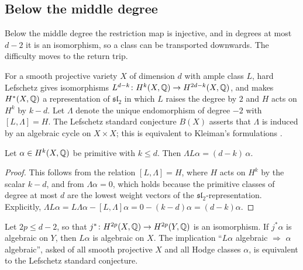 \subsection{Below the middle degree}

Below the middle degree the restriction map is injective, and in degrees at
most $d-2$ it is an isomorphism, so a class can be transported downwards. The
difficulty moves to the return trip.

\begin{definition}\label{def:Bconj}
For a smooth projective variety $X$ of dimension $d$ with ample class $L$,
hard Lefschetz gives isomorphisms
$L^{d-k}\colon H^{k}(X,\mathbb{Q})\to H^{2d-k}(X,\mathbb{Q})$, and makes $H^{*}(X,\mathbb{Q})$
a representation of $\mathfrak{sl}_{2}$ in which $L$ raises the degree by
$2$ and $H$ acts on $H^{k}$ by $k-d$. Let $\Lambda$ denote the unique
endomorphism of degree $-2$ with $[L,\Lambda]=H$. The Lefschetz standard
conjecture $B(X)$ asserts that $\Lambda$ is induced by an algebraic cycle on
$X\times X$; this is equivalent to Kleiman's formulations \cite{Kle68,Kle94}.
\end{definition}

\begin{lemma}\label{lem:LambdaL}
Let $\alpha\in H^{k}(X,\mathbb{Q})$ be primitive with $k\le d$. Then
$\Lambda L\alpha=(d-k)\,\alpha$.
\end{lemma}

\begin{proof}
This follows from the relation $[L,\Lambda]=H$, where $H$ acts on $H^{k}$ by
the scalar $k-d$, and from $\Lambda\alpha=0$, which holds because the
primitive classes of degree at most $d$ are the lowest weight vectors of the
$\mathfrak{sl}_{2}$-representation. Explicitly,
$\Lambda L\alpha=L\Lambda\alpha-[L,\Lambda]\alpha=0-(k-d)\alpha
=(d-k)\alpha$.
\end{proof}

\begin{theorem}\label{thm:returntrip}
Let $2p\le d-2$, so that $j^{*}\colon H^{2p}(X,\mathbb{Q})\to H^{2p}(Y,\mathbb{Q})$ is an
isomorphism. If $j^{*}\alpha$ is algebraic on $Y$, then $L\alpha$ is algebraic
on $X$. The implication ``$L\alpha$ algebraic $\Rightarrow$ $\alpha$
algebraic'', asked of all smooth projective $X$ and all Hodge classes
$\alpha$, is
equivalent to the Lefschetz standard conjecture.
\end{theorem}

